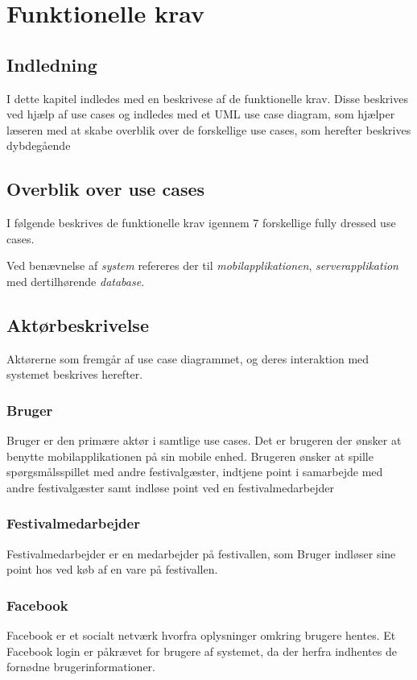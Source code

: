 \chapter{Funktionelle krav} 
\label{chp:funktionellekrav}

\section{Indledning}
I dette kapitel indledes med en beskrivese af de funktionelle krav. Disse beskrives ved hjælp af use cases og indledes med et UML use case diagram, som hjælper læseren med at skabe overblik over de forskellige use cases, som herefter beskrives dybdegående

\section{Overblik over use cases}
I følgende beskrives de funktionelle krav igennem 7 forskellige  fully dressed use cases. 

Ved benævnelse af \emph{system} refereres der til \emph{mobilapplikationen}, \emph{serverapplikation} med dertilhørende \emph{database}.


\section{Aktørbeskrivelse}
Aktørerne som fremgår af use case diagrammet, og deres interaktion med systemet beskrives herefter.

\subsection{Bruger}
Bruger er den primære aktør i samtlige use cases. Det er brugeren der ønsker at benytte mobilapplikationen på sin mobile enhed. Brugeren ønsker at spille spørgsmålsspillet med andre festivalgæster, indtjene point i samarbejde med andre festivalgæster samt indløse point ved en festivalmedarbejder

\subsection{Festivalmedarbejder}
Festivalmedarbejder er en medarbejder på festivallen, som Bruger indløser sine point hos ved køb af en vare på festivallen.

\subsection{Facebook}
Facebook er et socialt netværk hvorfra oplysninger omkring brugere hentes. Et Facebook login er påkrævet for brugere af systemet, da der herfra indhentes de fornødne brugerinformationer.

